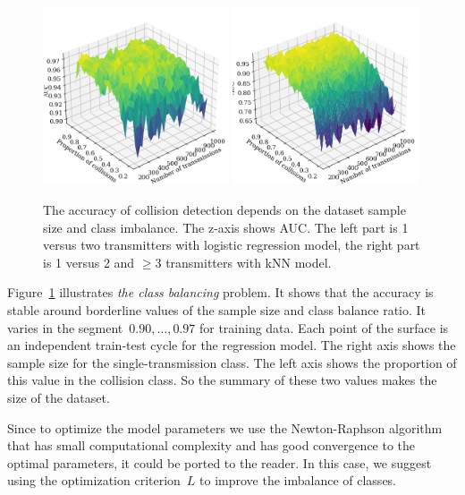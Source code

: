 \documentclass[12pt]{article}
\begin{document}
\begin{figure}[!htbp]
\centering
\includegraphics[width=0.49\textwidth]{fig_sampe_size_mean2}
\includegraphics[width=0.49\textwidth]{fig_sampe_size_kNN}
\caption{The accuracy of collision detection depends on the dataset sample size and class imbalance. The z-axis shows AUC. The left part is 1 versus two transmitters with logistic regression model, the right part is 1 versus 2 and $\geq 3$ transmitters with kNN model.}
\label{fig:samle_size}
\end{figure}

Figure~\ref{fig:samle_size} illustrates \emph{the class balancing} problem. It shows that the accuracy is stable around borderline values of the sample size and class balance ratio. It varies in the segment~$0.90,\ldots,0.97$ for training data. Each point of the surface is an independent train-test cycle for the regression model. The right axis shows the sample size for the single-transmission class. The left axis shows the proportion of this value in the collision class. So the summary of these two values makes the size of the dataset. 

Since to optimize the model parameters we use the Newton-Raphson algorithm~\cite{Motrenko2014} that has small computational complexity and has good convergence to the optimal parameters, it could be ported to the reader. In this case, we suggest using the optimization criterion~$L$ to improve the imbalance of classes.  
\end{document}
